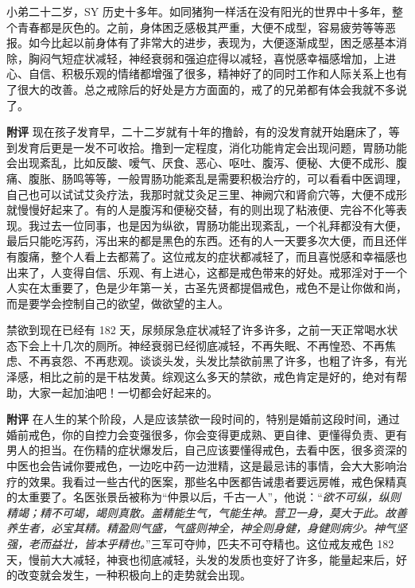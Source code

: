\begin{case}[神经衰弱]
    小弟二十二岁，SY 历史十多年。如同猪狗一样活在没有阳光的世界中十多年，整个青春都是灰色的。之前，身体困乏感极其严重，大便不成型，容易疲劳等等恶报。如今比起以前身体有了非常大的进步，表现为，大便逐渐成型，困乏感基本消除，胸闷气短症状减轻，神经衰弱和强迫症得以减轻，喜悦感幸福感增加，上进心、自信、积极乐观的情绪都增强了很多，精神好了的同时工作和人际关系上也有了很大的改善。总之戒除后的好处是方方面面的，戒了的兄弟都有体会我就不多说了。

    \textbf{附评} 现在孩子发育早，二十二岁就有十年的撸龄，有的没发育就开始磨床了，等到发育后更是一发不可收拾。撸到一定程度，消化功能肯定会出现问题，胃肠功能会出现紊乱，比如反酸、嗳气、厌食、恶心、呕吐、腹泻、便秘、大便不成形、腹痛、腹胀、肠鸣等等，一般胃肠功能紊乱是需要积极治疗的，可以看看中医调理，自己也可以试试艾灸疗法，我那时就艾灸足三里、神阙穴和肾俞穴等，大便不成形就慢慢好起来了。有的人是腹泻和便秘交替，有的则出现了粘液便、完谷不化等表现。我过去一位同事，也是因为纵欲，胃肠功能出现紊乱，一个礼拜都没有大便，最后只能吃泻药，泻出来的都是黑色的东西。还有的人一天要多次大便，而且还伴有腹痛，整个人看上去都蔫了。这位戒友的症状都减轻了，而且喜悦感和幸福感也出来了，人变得自信、乐观、有上进心，这都是戒色带来的好处。戒邪淫对于一个人实在太重要了，色是少年第一关，古圣先贤都提倡戒色，戒色不是让你做和尚，而是要学会控制自己的欲望，做欲望的主人。
\end{case}

\begin{case}[神经衰弱]
    禁欲到现在已经有 182 天，尿频尿急症状减轻了许多许多，之前一天正常喝水状态下会上十几次的厕所。神经衰弱已经彻底减轻，不再失眠、不再惶恐、不再焦虑、不再哀怨、不再悲观。谈谈头发，头发比禁欲前黑了许多，也粗了许多，有光泽感，相比之前的是干枯发黄。综观这么多天的禁欲，戒色肯定是好的，绝对有帮助，大家一起加油吧！一切都会好起来的。

    \textbf{附评} 在人生的某个阶段，人是应该禁欲一段时间的，特别是婚前这段时间，通过婚前戒色，你的自控力会变强很多，你会变得更成熟、更自律、更懂得负责、更有男人的担当。在伤精的症状爆发后，自己应该要懂得戒色，去看中医，很多资深的中医也会告诫你要戒色，一边吃中药一边泄精，这是最忌讳的事情，会大大影响治疗的效果。我看过一些古代的医案，那些名中医都告诫患者要远房帷，戒色保精真的太重要了。名医张景岳被称为“仲景以后，千古一人”，他说：“\textit{欲不可纵，纵则精竭；精不可竭，竭则真散。盖精能生气，气能生神。营卫一身，莫大于此。故善养生者，必宝其精。精盈则气盛，气盛则神全，神全则身健，身健则病少。神气坚强，老而益壮，皆本乎精也。}”三军可夺帅，匹夫不可夺精也。这位戒友戒色 182 天，慢前大大减轻，神衰也彻底减轻，头发的发质也变好了许多，能量起来后，好的改变就会发生，一种积极向上的走势就会出现。
\end{case}

